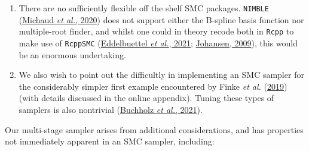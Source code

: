 \documentclass[
  10pt,
  a4paper,
]{article}
\providecommand{\tightlist}{%
  \setlength{\itemsep}{0pt}\setlength{\parskip}{0pt}}
\begin{document}
\begin{enumerate}
\def\labelenumi{\arabic{enumi}.}
\tightlist
\item
  There are no sufficiently flexible off the shelf SMC packages.
  \texttt{NIMBLE}
  (\protect\hyperlink{ref-michaud_sequential_2020}{Michaud \emph{et
  al.}, 2020}) does not support either the B-spline basis function nor
  multiple-root finder, and whilst one could in theory recode both in
  \texttt{Rcpp} to make use of \texttt{RcppSMC}
  (\protect\hyperlink{ref-eddelbuettel_rcppsmc_2021}{Eddelbuettel
  \emph{et al.}, 2021};
  \protect\hyperlink{ref-johansen_smctc_2009}{Johansen, 2009}), this
  would be an enormous undertaking.
\item
  We also wish to point out the difficultly in implementing an SMC
  sampler for the considerably simpler first example encountered by
  Finke \emph{et al.}
  (\protect\hyperlink{ref-finke_efficient_2019}{2019}) (with details
  discussed in the online appendix). Tuning these types of samplers is
  also nontrivial
  (\protect\hyperlink{ref-buchholz_adaptive_2021}{Buchholz \emph{et
  al.}, 2021}).
\end{enumerate}

Our multi-stage sampler arises from additional considerations, and has
properties not immediately apparent in an SMC sampler, including:
\end{document}
